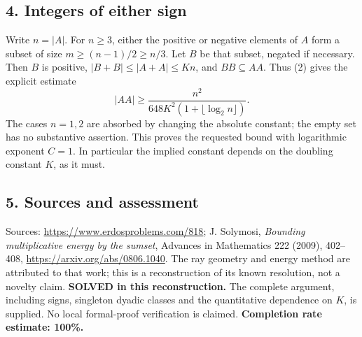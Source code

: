 \subsection*{4. Integers of either sign}
Write $n=|A|$. For $n\ge3$, either the positive or negative elements of $A$ form a subset of size $m\ge(n-1)/2\ge n/3$. Let $B$ be that subset, negated if necessary. Then $B$ is positive, $|B+B|\le|A+A|\le Kn$, and $BB\subseteq AA$. Thus (2) gives the explicit estimate
\[
 |AA|\ge\frac{n^2}{648K^2(1+\lfloor\log_2 n\rfloor)}.
\]
The cases $n=1,2$ are absorbed by changing the absolute constant; the empty set has no substantive assertion. This proves the requested bound with logarithmic exponent $C=1$. In particular the implied constant depends on the doubling constant $K$, as it must.
\subsection*{5. Sources and assessment}
Sources: \url{https://www.erdosproblems.com/818}; J. Solymosi, \emph{Bounding multiplicative energy by the sumset}, Advances in Mathematics 222 (2009), 402--408, \url{https://arxiv.org/abs/0806.1040}. The ray geometry and energy method are attributed to that work; this is a reconstruction of its known resolution, not a novelty claim.
\textbf{SOLVED in this reconstruction.} The complete argument, including signs, singleton dyadic classes and the quantitative dependence on $K$, is supplied. No local formal-proof verification is claimed.
\textbf{Completion rate estimate: 100\%.}
